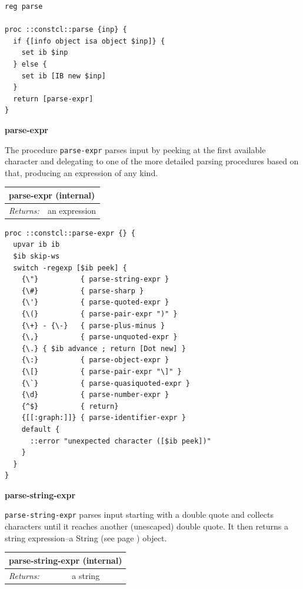 \documentclass[twoside,9pt]{report}
\begin{document}
\noindent\makebox[\linewidth]{\rule{\linewidth}{0.4pt}}
\begin{lstlisting}
reg parse
 
proc ::constcl::parse {inp} {
  if {[info object isa object $inp]} {
    set ib $inp
  } else {
    set ib [IB new $inp]
  }
  return [parse-expr]
}
\end{lstlisting}
\noindent\makebox[\linewidth]{\rule{\linewidth}{0.4pt}}

\textbf{parse-expr}


The procedure \texttt{parse-expr} parses input by peeking at the first available character and delegating to one of the more detailed parsing procedures based on that, producing an expression of any kind.

\begin{tabular}{ |l l| }
\hline
\multicolumn{2}{|l|}{parse-expr (internal)} \\
\hline
\textit{Returns:} & an expression \\
\hline
\end{tabular}

\noindent\makebox[\linewidth]{\rule{\linewidth}{0.4pt}}
\begin{lstlisting}
proc ::constcl::parse-expr {} {
  upvar ib ib
  $ib skip-ws
  switch -regexp [$ib peek] {
    {\"}          { parse-string-expr }
    {\#}          { parse-sharp }
    {\'}          { parse-quoted-expr }
    {\(}          { parse-pair-expr ")" }
    {\+} - {\-}   { parse-plus-minus }
    {\,}          { parse-unquoted-expr }
    {\.} { $ib advance ; return [Dot new] }
    {\:}          { parse-object-expr }
    {\[}          { parse-pair-expr "\]" }
    {\`}          { parse-quasiquoted-expr }
    {\d}          { parse-number-expr }
    {^$}          { return}
    {[[:graph:]]} { parse-identifier-expr }
    default {
      ::error "unexpected character ([$ib peek])"
    }
  }
}
\end{lstlisting}
\noindent\makebox[\linewidth]{\rule{\linewidth}{0.4pt}}

\textbf{parse-string-expr}


\texttt{parse-string-expr} parses input starting with a double quote and collects characters until it reaches another (unescaped) double quote. It then returns a string expression--a String (see page \pageref{strings}) object.

\begin{tabular}{ |l l| }
\hline
\multicolumn{2}{|l|}{parse-string-expr (internal)} \\
\hline
\textit{Returns:} & a string \\
\hline
\end{tabular}
\end{document}
